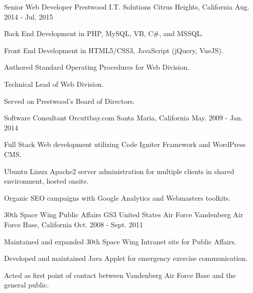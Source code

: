\begin{cventries}
  \cventry
    {Senior Web Developer} %
    {Prestwood I.T. Solutions} %
    {Citrus Heights, California} %
    {Aug. 2014 - Jul. 2015} %
    {
      \begin{cvitems} %
        \item {Back End Development in PHP, MySQL, VB, C\#, and MSSQL.}
        \item {Front End Development in HTML5/CSS3, JavaScript (jQuery, VueJS). }
        \item {Authored Standard Operating Procedures for Web Division.}
        \item {Technical Lead of Web Division.}
        \item {Served on Prestwood's Board of Directors.}
      \end{cvitems}
    }

  \cventry
    {Software Consultant} %
    {Orcuttbay.com} %
    {Santa Maria, California} %
    {May. 2009 - Jan. 2014} %
    {
      \begin{cvitems} %
        \item {Full Stack Web development utilizing Code Igniter Framework and WordPress CMS.}
        \item {Ubuntu Linux Apache2 server administration for multiple clients in shared environment, hosted onsite. }
        \item {Organic SEO campaigns with Google Analytics and Webmasters toolkits.}
      \end{cvitems}
    }

  \cventry
    {30th Space Wing Public Affairs GS3} %
    {United States Air Force} %
    {Vandenberg Air Force Base, California} %
    {Oct. 2008 - Sept. 2011} %
    {
      \begin{cvitems} %
        \item {Maintained and expanded 30th Space Wing Intranet site for Public Affairs.}
        \item {Developed and maintained Java Applet for emergency exercise communication.}
        \item {Acted as first point of contact between Vandenberg Air Force Base and the general public.}
      \end{cvitems}
    }


\end{cventries}
